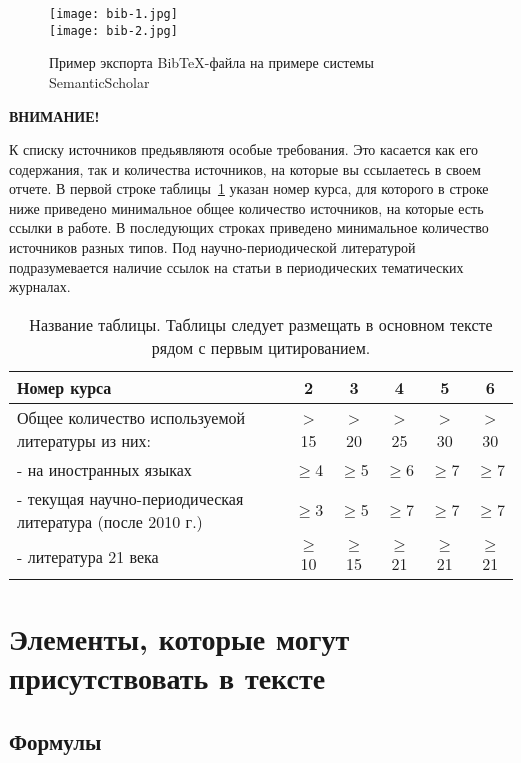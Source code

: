 \begin{figure}[h!]
\begin{center}
\texttt{[image: bib-1.jpg]}\\[2mm]
\texttt{[image: bib-2.jpg]}\\[2mm]
\caption{Пример экспорта Bib\TeX-файла на примере системы SemanticScholar}\label{fig:BibTex}
\end{center}
\end{figure}

\newpage
\textbf{ВНИМАНИЕ!}

К списку источников предьявляютя особые требования. Это касается как его содержания, так и количества источников, на которые вы ссылаетесь в своем отчете. В первой строке таблицы~\ref{tab:lit} указан номер курса, для которого в строке ниже приведено минимальное общее количество источников, на которые есть ссылки в работе. В последующих строках приведено минимальное количество источников разных типов. Под научно-периодической литературой подразумевается наличие ссылок на статьи в периодических тематических журналах.

\begin{table}[h]
\caption{Название таблицы. Таблицы следует размещать в основном тексте рядом с первым цитированием.}
\label{tab:lit}
\begin{center}
\begin{tabular}{|p{7.5 cm}|c|c|c|c|c|}
\hline
 Номер курса & 2 & 3 & 4 & 5 & 6\\
\hline
Общее количество используемой литературы из них: & > 15 & > 20 & > 25 & > 30 & > 30 \\
\hline
- на иностранных языках & $\ge$4 & $\ge$5 & $\ge$6 & $\ge$7 & $\ge$7 \\
\hline
- текущая научно-периодическая литература (после 2010 г.)& $\ge$3 & $\ge$5 & $\ge$7 & $\ge$7 & $\ge$7  \\
\hline
- литература 21 века & $\ge$10 & $\ge$15 & $\ge$21 & $\ge$21 & $\ge$21 \\
\hline
\end{tabular}
\end{center}
\end{table}

\chapter{Элементы, которые могут присутствовать в тексте}

\section{Формулы}

